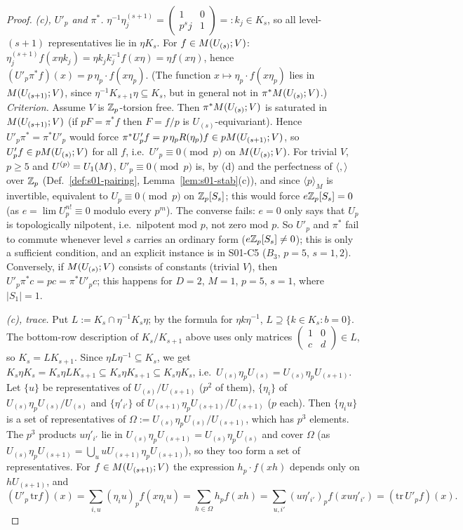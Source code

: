 \begin{proof}
\emph{(c), $U'_p$ and $\pi^*$.} $\eta^{-1}\eta^{(s+1)}_j=\left(\begin{smallmatrix}1&0\\p^sj&1\end{smallmatrix}\right)=:k_j\in K_s$, so all level-$(s+1)$
representatives lie in $\eta K_s$. For $f\in M(U_{(s)};V)$: $\eta^{(s+1)}_jf(x\eta k_j)=\eta k_jk_j^{-1}f(x\eta)=\eta f(x\eta)$, hence
$(U'_p\pi^*f)(x)=p\,\eta_p\cdot f(x\eta_p)$. (The function $x\mapsto\eta_p\cdot f(x\eta_p)$ lies in $M(U_{(s+1)};V)$, since
$\eta^{-1}K_{s+1}\eta\subseteq K_s$, but in general not in $\pi^*M(U_{(s)};V)$.) \emph{Criterion.} Assume $V$ is $\mathbb{Z}_p$-torsion free.
Then $\pi^*M(U_{(s)};V)$ is saturated in $M(U_{(s+1)};V)$ (if $pF=\pi^*f$ then $F=f/p$ is $U_{(s)}$-equivariant). Hence
$U'_p\pi^*=\pi^*U'_p$ would force $\pi^*U'_pf=p\,\eta_pR(\eta_p)f\in pM(U_{(s+1)};V)$, so $U'_pf\in pM(U_{(s)};V)$ for all $f$,
i.e.\ $U'_p\equiv0\pmod p$ on $M(U_{(s)};V)$. For trivial $V$, $p\ge5$ and $U^{(p)}=U_1(M)$, $U'_p\equiv0\pmod p$ is, by (d) and
the perfectness of $\langle,\rangle$ over $\mathbb{Z}_p$ (Def.~\ref{def:s01-pairing}, Lemma~\ref{lem:s01-stab}(c)), and since $\langle p\rangle_M$ is
invertible, equivalent to $U_p\equiv0\pmod p$ on $\mathbb{Z}_p[S_s]$; this would force $e\mathbb{Z}_p[S_s]=0$ (as $e=\lim U_p^{n!}\equiv0$ modulo every $p^m$).
The converse fails: $e=0$ only says that $U_p$ is topologically nilpotent, i.e.\ nilpotent mod $p$, not zero mod $p$. So $U'_p$ and
$\pi^*$ fail to commute whenever level $s$ carries an ordinary form ($e\mathbb{Z}_p[S_s]\ne0$); this is only a sufficient condition, and
an explicit instance is \stcomp{} in S01-C5 ($B_3$, $p=5$, $s=1,2$). Conversely, if $M(U_{(s)};V)$ consists of constants (trivial $V$),
then $U'_p\pi^*c=pc=\pi^*U'_pc$; this happens for $D=2$, $M=1$, $p=5$, $s=1$, where $|S_1|=1$.

\emph{(c), trace.} Put $L:=K_s\cap\eta^{-1}K_s\eta$; by the formula for $\eta k\eta^{-1}$, $L\supseteq\{k\in K_s:b=0\}$. The bottom-row
description of $K_s/K_{s+1}$ above uses only matrices $\left(\begin{smallmatrix}1&0\\c&d\end{smallmatrix}\right)\in L$, so $K_s=LK_{s+1}$. Since
$\eta L\eta^{-1}\subseteq K_s$, we get $K_s\eta K_s=K_s\eta LK_{s+1}\subseteq K_s\eta K_{s+1}\subseteq K_s\eta K_s$, i.e.\
$U_{(s)}\eta_pU_{(s)}=U_{(s)}\eta_pU_{(s+1)}$. Let $\{u\}$ be representatives of $U_{(s)}/U_{(s+1)}$ ($p^2$ of them), $\{\eta_i\}$ of
$U_{(s)}\eta_pU_{(s)}/U_{(s)}$ and $\{\eta'_{i'}\}$ of $U_{(s+1)}\eta_pU_{(s+1)}/U_{(s+1)}$ ($p$ each). Then $\{\eta_iu\}$ is a set of
representatives of $\Omega:=U_{(s)}\eta_pU_{(s)}/U_{(s+1)}$, which has $p^3$ elements. The $p^3$ products $u\eta'_{i'}$ lie in
$U_{(s)}\eta_pU_{(s+1)}=U_{(s)}\eta_pU_{(s)}$ and cover $\Omega$ (as $U_{(s)}\eta_pU_{(s+1)}=\bigcup_uuU_{(s+1)}\eta_pU_{(s+1)}$), so they too
form a set of representatives. For $f\in M(U_{(s+1)};V)$ the expression $h_p\cdot f(xh)$ depends only on $hU_{(s+1)}$, and
\[(U'_p\,\mathrm{tr}f)(x)=\sum_{i,u}(\eta_iu)_pf(x\eta_iu)=\sum_{h\in\Omega}h_pf(xh)=\sum_{u,i'}(u\eta'_{i'})_pf(xu\eta'_{i'})=(\mathrm{tr}\,U'_pf)(x).\]


\end{proof}
